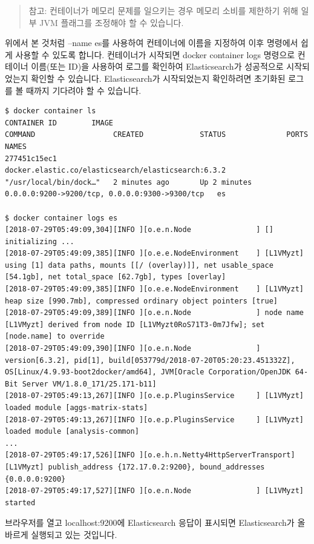 \begin{quote}
참고: 컨테이너가 메모리 문제를 일으키는 경우 메모리 소비를 제한하기 위해 일부 JVM 플래그를 조정해야 할 수 있습니다.
\end{quote}
위에서 본 것처럼 --name es를 사용하여 컨테이너에 이름을 지정하여 이후 명령에서 쉽게 사용할 수 있도록 합니다. 컨테이너가 시작되면 docker container logs 명령으로 컨테이너 이름(또는 ID)을 사용하여 로그를 확인하여 Elasticsearch가 성공적으로 시작되었는지 확인할 수 있습니다. Elasticsearch가 시작되었는지 확인하려면 초기화된 로그를 볼 때까지 기다려야 할 수 있습니다.
\begin{verbatim}
$ docker container ls
CONTAINER ID        IMAGE                                                 COMMAND                  CREATED             STATUS              PORTS                                            NAMES
277451c15ec1        docker.elastic.co/elasticsearch/elasticsearch:6.3.2   "/usr/local/bin/dock…"   2 minutes ago       Up 2 minutes        0.0.0.0:9200->9200/tcp, 0.0.0.0:9300->9300/tcp   es

$ docker container logs es
[2018-07-29T05:49:09,304][INFO ][o.e.n.Node               ] [] initializing ...
[2018-07-29T05:49:09,385][INFO ][o.e.e.NodeEnvironment    ] [L1VMyzt] using [1] data paths, mounts [[/ (overlay)]], net usable_space [54.1gb], net total_space [62.7gb], types [overlay]
[2018-07-29T05:49:09,385][INFO ][o.e.e.NodeEnvironment    ] [L1VMyzt] heap size [990.7mb], compressed ordinary object pointers [true]
[2018-07-29T05:49:09,389][INFO ][o.e.n.Node               ] node name [L1VMyzt] derived from node ID [L1VMyzt0RoS71T3-0m7Jfw]; set [node.name] to override
[2018-07-29T05:49:09,390][INFO ][o.e.n.Node               ] version[6.3.2], pid[1], build[053779d/2018-07-20T05:20:23.451332Z], OS[Linux/4.9.93-boot2docker/amd64], JVM[Oracle Corporation/OpenJDK 64-Bit Server VM/1.8.0_171/25.171-b11]
[2018-07-29T05:49:13,267][INFO ][o.e.p.PluginsService     ] [L1VMyzt] loaded module [aggs-matrix-stats]
[2018-07-29T05:49:13,267][INFO ][o.e.p.PluginsService     ] [L1VMyzt] loaded module [analysis-common]
...
[2018-07-29T05:49:17,526][INFO ][o.e.h.n.Netty4HttpServerTransport] [L1VMyzt] publish_address {172.17.0.2:9200}, bound_addresses {0.0.0.0:9200}
[2018-07-29T05:49:17,527][INFO ][o.e.n.Node               ] [L1VMyzt] started
\end{verbatim}

브라우저를 열고 localhost:9200에 Elasticsearch 응답이 표시되면 Elasticsearch가 올바르게 실행되고 있는 것입니다.

